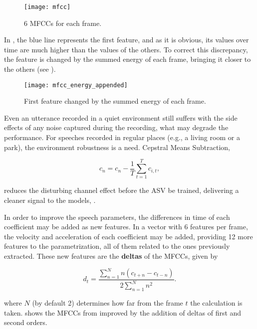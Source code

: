 \begin{figure}[ht]
    \centering
    \texttt{[image: mfcc]}
    \caption{6 MFCCs for each frame.}
    \label{fig:mfcc}
\end{figure}


In , the blue line represents the first feature, and as it is obvious, its values over time are much higher than the values of the others. To correct this discrepancy, the feature is changed by the summed energy of each frame, bringing it closer to the others (see ).

\begin{figure}[ht]
    \centering
    \texttt{[image: mfcc\_energy\_appended]}
    \caption{First feature changed by the summed energy of each frame.}
    \label{fig:mfcc_energy_appended}
\end{figure}


Even an utterance recorded in a quiet environment still suffers with the side effects of any noise captured during the recording, what may degrade the performance. For speeches recorded in regular places (e.g., a living room or a park), the environment robustness is a need. Cepstral Means Subtraction,

\begin{equation}
    c_n = c_n - \frac{1}{T} \sum_{t=1}^T c_{i,t},
    \label{eq:cms}
\end{equation}

\noindent reduces the disturbing channel effect before the ASV be trained, delivering a cleaner signal to the models, .


In order to improve the speech parameters, the differences in time of each coefficient may be added as new features. In a vector with 6 features per frame, the velocity and acceleration of each coefficient may be added, providing 12 more features to the parametrization, all of them related to the ones previously extracted. These new features are the \textbf{deltas} of the MFCCs, given by

\begin{equation}
    d_t = \frac{\sum_{n=1}^N n(c_{t+n} - c_{t-n})}{2\sum_{n=1}^N n^2}.
    \label{eq:deltas}
\end{equation}

\noindent where $N$ (by default 2) determines how far from the frame $t$ the calculation is taken.  shows the MFCCs from  improved by the addition of deltas of first and second orders.


